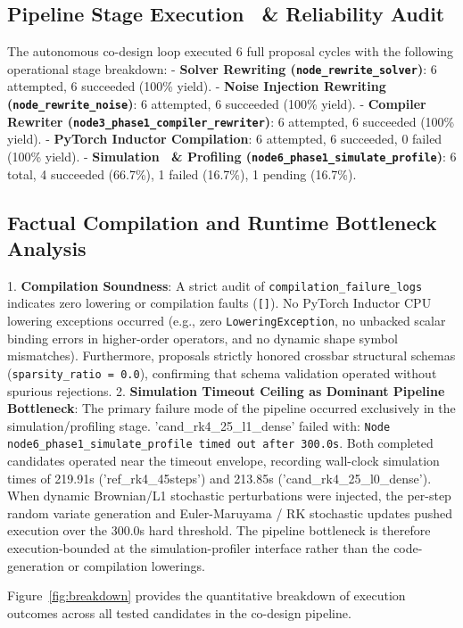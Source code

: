 \documentclass[10pt,conference]{IEEEtran}
\begin{document}
\subsection{Pipeline Stage Execution \ &  Reliability Audit}

The autonomous co-design loop executed 6 full proposal cycles with the following operational stage breakdown:
- \textbf{Solver Rewriting (\texttt{node\_rewrite\_solver})}: 6 attempted, 6 succeeded (100\% yield).
- \textbf{Noise Injection Rewriting (\texttt{node\_rewrite\_noise})}: 6 attempted, 6 succeeded (100\% yield).
- \textbf{Compiler Rewriter (\texttt{node3\_phase1\_compiler\_rewriter})}: 6 attempted, 6 succeeded (100\% yield).
- \textbf{PyTorch Inductor Compilation}: 6 attempted, 6 succeeded, 0 failed (100\% yield).
- \textbf{Simulation \ &  Profiling (\texttt{node6\_phase1\_simulate\_profile})}: 6 total, 4 succeeded (66.7\%), 1 failed (16.7\%), 1 pending (16.7\%).

\subsection{Factual Compilation and Runtime Bottleneck Analysis}
1. \textbf{Compilation Soundness}: A strict audit of \texttt{compilation\_failure\_logs} indicates zero lowering or compilation faults (\texttt{[]}). No PyTorch Inductor CPU lowering exceptions occurred (e.g., zero \texttt{LoweringException}, no unbacked scalar binding errors in higher-order operators, and no dynamic shape symbol mismatches). Furthermore, proposals strictly honored crossbar structural schemas (\texttt{sparsity\_ratio = 0.0}), confirming that schema validation operated without spurious rejections.
2. \textbf{Simulation Timeout Ceiling as Dominant Pipeline Bottleneck}: The primary failure mode of the pipeline occurred exclusively in the simulation/profiling stage. 'cand\_rk4\_25\_l1\_dense' failed with: \texttt{Node node6\_phase1\_simulate\_profile timed out after 300.0s}. Both completed candidates operated near the timeout envelope, recording wall-clock simulation times of 219.91s ('ref\_rk4\_45steps') and 213.85s ('cand\_rk4\_25\_l0\_dense'). When dynamic Brownian/L1 stochastic perturbations were injected, the per-step random variate generation and Euler-Maruyama / RK stochastic updates pushed execution over the 300.0s hard threshold. The pipeline bottleneck is therefore execution-bounded at the simulation-profiler interface rather than the code-generation or compilation lowerings.

Figure~\ref{fig:breakdown} provides the quantitative breakdown of execution outcomes across all tested candidates in the co-design pipeline.
\end{document}
